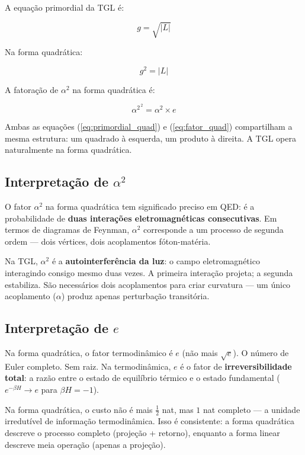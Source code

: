 \documentclass[12pt,a4paper,twoside]{article}
\newcommand{\alphaii}{\alpha^{2}}
\begin{document}
A equação primordial da TGL é:

\begin{equation}
g = \sqrt{|L|}
\end{equation}

Na forma quadrática:

\begin{equation}
g^2 = |L|
\label{eq:primordial_quad}
\end{equation}

A fatoração de $\alphaii$ na forma quadrática é:

\begin{equation}
\alphaii^{\,2} = \alpha^2 \times e
\label{eq:fator_quad}
\end{equation}

Ambas as equações (\ref{eq:primordial_quad}) e (\ref{eq:fator_quad}) compartilham a mesma estrutura: um quadrado à esquerda, um produto à direita. A TGL opera naturalmente na forma quadrática.

\subsection{Interpretação de $\alpha^2$}

O fator $\alpha^2$ na forma quadrática tem significado preciso em QED: é a probabilidade de \textbf{duas interações eletromagnéticas consecutivas}. Em termos de diagramas de Feynman, $\alpha^2$ corresponde a um processo de segunda ordem --- dois vértices, dois acoplamentos fóton-matéria.

Na TGL, $\alpha^2$ é a \textbf{autointerferência da luz}: o campo eletromagnético interagindo consigo mesmo duas vezes. A primeira interação projeta; a segunda estabiliza. São necessários dois acoplamentos para criar curvatura --- um único acoplamento ($\alpha$) produz apenas perturbação transitória.

\subsection{Interpretação de $e$}

Na forma quadrática, o fator termodinâmico é $e$ (não mais $\sqrt{e}$). O número de Euler completo. Sem raiz. Na termodinâmica, $e$ é o fator de \textbf{irreversibilidade total}: a razão entre o estado de equilíbrio térmico e o estado fundamental ($e^{-\beta H} \to e$ para $\beta H = -1$).

Na forma quadrática, o custo não é mais $\frac{1}{2}$ nat, mas $1$ nat completo --- a unidade irredutível de informação termodinâmica. Isso é consistente: a forma quadrática descreve o processo completo (projeção + retorno), enquanto a forma linear descreve meia operação (apenas a projeção).
\end{document}
